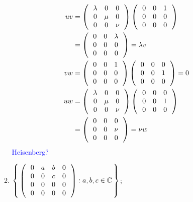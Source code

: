 \documentclass[12pt,a4paper]{report}
\newcommand{\BLUE}[1]{\textcolor{blue}{#1}}
\begin{document}
\begin{enumerate}[label=3.\arabic*.]
\begin{enumerate}[label=(\roman*)]
	\BLUE{\begin{align*}
		u v &= \THREEXTHREE{\lambda}{0}{0}{0}{\mu}{0}{0}{0}{\nu}\THREEXTHREE{0}{0}{1}{0}{0}{0}{0}{0}{0} \\
		&= \THREEXTHREE {0}{0}{\lambda}{0}{0}{0}{0}{0}{0} = \lambda v \\
		v w &= \THREEXTHREE{0}{0}{1}{0}{0}{0}{0}{0}{0}\THREEXTHREE{0}{0}{0}{0}{0}{1}{0}{0}{0} = 0\\
	u w &= \THREEXTHREE{\lambda}{0}{0}{0}{\mu}{0}{0}{0}{\nu}\THREEXTHREE{0}{0}{0}{0}{0}{1}{0}{0}{0} \\
	&= \THREEXTHREE{0}{0}{0}{0}{0}{\nu}{0}{0}{0} = \nu w
\end{align*}	Heisenberg?
	}
	
	\item $\BRACKET{\PAREN{\begin{array}{cccc}
		0&a&b&0 \\
		0&0&c&0\\
		0&0&0&0\\
		0&0&0&0\\	
	\end{array}
	}: a,b,c \in \C}$;
	

\end{enumerate}
\end{enumerate}
\end{document}
